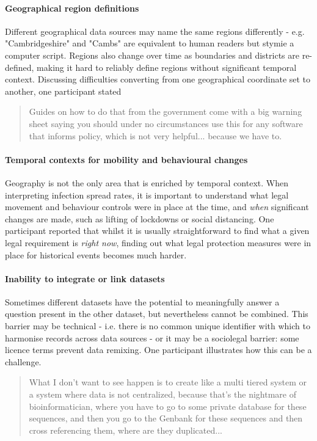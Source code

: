 \documentclass{CUP-JNL-DAP}%
\begin{document}
\paragraph{Geographical region definitions} 
Different geographical data sources may name the same regions differently - e.g. "Cambridgeshire" and "Cambs" are equivalent to human readers but stymie a computer script. Regions also change over time as boundaries and districts are re-defined, making it hard to reliably define regions without significant temporal context. Discussing difficulties converting from one geographical coordinate set to another, one participant stated 
\blockquote{Guides on how to do that from the government come with a big warning sheet saying you should under no circumstances use this for any software that informs policy, which is not very helpful... because we have to.}

\paragraph{Temporal contexts for mobility and behavioural changes}
Geography is not the only area that is enriched by temporal context. When interpreting infection spread rates, it is important to understand what legal movement and behaviour controls were in place at the time, and \textit{when} significant changes are made, such as lifting of lockdowns or social distancing. One participant reported that whilst it is usually straightforward to find what a given legal requirement is \textit{right now}, finding out what legal protection measures were in place for historical events becomes much harder. 

\paragraph{Inability to integrate or link datasets}
Sometimes different datasets have the potential to meaningfully answer a question present in the other dataset, but nevertheless cannot be combined. This barrier may be technical - i.e. there is no common unique identifier with which to harmonise records across data sources - or it may be a sociolegal barrier: some licence terms prevent data remixing. One participant illustrates how this can be a challenge.

\blockquote{What I don't want to see happen is to create like a multi tiered system or a system where data is not centralized, because that's the nightmare of bioinformatician, where you have to go to some private database for these sequences, and then you go to the Genbank for these sequences and then cross referencing them, where are they duplicated...}
\end{document}
